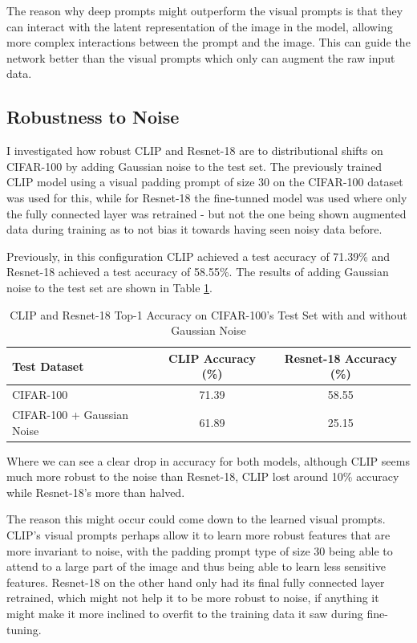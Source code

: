 \documentclass[a4paper]{article}
\begin{document}
The reason why deep prompts might outperform the visual prompts is that they can interact with the latent
representation of the image in the model, allowing more complex interactions between the prompt and the image. This
can guide the network better than the visual prompts which only can augment the raw input data.

\subsection{Robustness to Noise}
I investigated how robust CLIP and Resnet-18 are to distributional shifts on CIFAR-100 by adding Gaussian noise to
the test set. The previously trained CLIP model using a visual padding prompt of size 30 on the CIFAR-100 dataset
was used for this, while for Resnet-18 the fine-tunned model was used where only the fully connected layer was
retrained - but not the one being shown augmented data during training as to not bias it towards having seen noisy
data before.

Previously, in this configuration CLIP achieved a test accuracy of 71.39\% and Resnet-18 achieved a test accuracy
of 58.55\%. The results of adding Gaussian noise to the test set are shown in Table \ref{tab:robustness}.

\begin{table}[h]
    \centering
    \begin{tabular}{|l|c|c|}
    \hline
    \rowcolor{Gray}
    \textbf{Test Dataset} & \textbf{CLIP Accuracy (\%)} & \textbf{Resnet-18 Accuracy (\%)} \\ \hline
    CIFAR-100 & 71.39 & 58.55 \\ \hline
    CIFAR-100 + Gaussian Noise & 61.89 & 25.15 \\ \hline
    \end{tabular}
    \caption{CLIP and Resnet-18 Top-1 Accuracy on CIFAR-100's Test Set with and without Gaussian Noise}
    \label{tab:robustness}
\end{table}

Where we can see a clear drop in accuracy for both models, although CLIP seems much more robust to the noise than
Resnet-18, CLIP lost around 10\% accuracy while Resnet-18's more than halved.

The reason this might occur could come down to the learned visual prompts. CLIP's visual prompts perhaps allow it
to learn more robust features that are more invariant to noise, with the padding prompt type of size 30 being able
to attend to a large part of the image and thus being able to learn less sensitive features. Resnet-18 on the other
hand only had its final fully connected layer retrained, which might not help it to be more robust to noise, if
anything it might make it more inclined to overfit to the training data it saw during fine-tuning.
\bigskip
\end{document}
